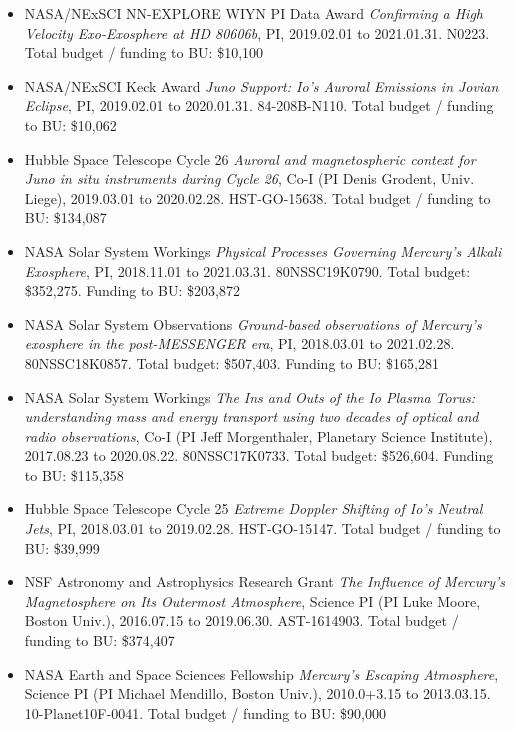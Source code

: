 \documentclass[12pt]{report}
\begin{document}
\begin{itemize}
 \item NASA/NExSCI NN-EXPLORE WIYN PI Data Award {\it Confirming a High Velocity Exo-Exosphere at HD 80606b}, PI, 2019.02.01 to 2021.01.31. N0223. Total budget / funding to BU: \$10,100
 \item NASA/NExSCI Keck Award {\it Juno Support: Io's Auroral Emissions in Jovian Eclipse}, PI, 2019.02.01 to 2020.01.31. 84-208B-N110. Total budget / funding to BU: \$10,062
 \item Hubble Space Telescope Cycle 26 {\it Auroral and magnetospheric context for Juno in situ instruments during Cycle 26}, Co-I (PI Denis Grodent, Univ. Liege), 2019.03.01 to 2020.02.28. HST-GO-15638. Total budget / funding to BU: \$134,087
 \item NASA Solar System Workings  {\it Physical Processes Governing Mercury's Alkali Exosphere}, PI, 2018.11.01 to 2021.03.31. 80NSSC19K0790. Total budget: \$352,275. Funding to BU: \$203,872
 \item NASA Solar System Observations {\it Ground-based observations of Mercury's exosphere in the post-MESSENGER era}, PI, 2018.03.01 to 2021.02.28. 80NSSC18K0857. Total budget: \$507,403. Funding to BU: \$165,281
 \item NASA Solar System Workings {\it The Ins and Outs of the Io Plasma Torus: understanding mass and energy transport using two decades of optical and radio observations}, Co-I (PI Jeff Morgenthaler, Planetary Science Institute), 2017.08.23 to 2020.08.22. 80NSSC17K0733. Total budget: \$526,604. Funding to BU: \$115,358
 \item Hubble Space Telescope Cycle 25 {\it Extreme Doppler Shifting of Io's Neutral Jets}, PI, 2018.03.01 to 2019.02.28. HST-GO-15147. Total budget / funding to BU: \$39,999
 \item NSF Astronomy and Astrophysics Research Grant {\it The Influence of Mercury's Magnetosphere on Its Outermost Atmosphere}, Science PI (PI Luke Moore, Boston Univ.), 2016.07.15 to 2019.06.30. AST-1614903. Total budget / funding to BU: \$374,407
 \item NASA Earth and Space Sciences Fellowship {\it Mercury's Escaping Atmosphere}, Science PI (PI Michael Mendillo, Boston Univ.), 2010.0+3.15 to 2013.03.15. 10-Planet10F-0041. Total budget / funding to BU: \$90,000
 \end{itemize}
\vspace{2 mm}
\end{document}
